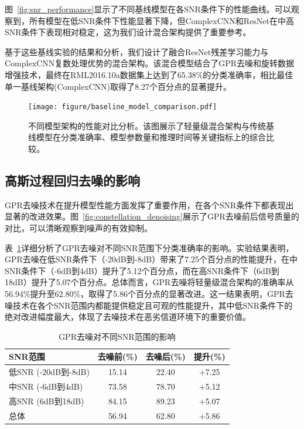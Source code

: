 \documentclass[conference]{IEEEtran}
\begin{document}
图~\ref{fig:snr_performance}显示了不同基线模型在各SNR条件下的性能曲线。可以观察到，所有模型在低SNR条件下性能显著下降，但ComplexCNN和ResNet在中高SNR条件下表现相对稳定，这为我们设计混合架构提供了重要参考。

基于这些基线实验的结果和分析，我们设计了融合ResNet残差学习能力与ComplexCNN复数处理优势的混合架构。该混合模型结合了GPR去噪和旋转数据增强技术，最终在RML2016.10a数据集上达到了65.38\%的分类准确率，相比最佳单一基线架构(ComplexCNN)取得了8.27个百分点的显著提升。

\begin{figure}[htbp]
\centering
\texttt{[image: figure/baseline\_model\_comparison.pdf]}
\caption{不同模型架构的性能对比分析。该图展示了轻量级混合架构与传统基线模型在分类准确率、模型参数量和推理时间等关键指标上的综合比较。}
\label{fig:model_comparison}
\end{figure}

\subsection{高斯过程回归去噪的影响}
GPR去噪技术在提升模型性能方面发挥了重要作用，在各个SNR条件下都表现出显著的改进效果。图~\ref{fig:constellation_denoising}展示了GPR去噪前后信号质量的对比，可以清晰观察到噪声的有效抑制。

表~\ref{tab:gpr_impact}详细分析了GPR去噪对不同SNR范围下分类准确率的影响。实验结果表明，GPR去噪在低SNR条件下（-20dB到-8dB）带来了7.25个百分点的性能提升，在中SNR条件下（-6dB到4dB）提升了5.12个百分点，而在高SNR条件下（6dB到18dB）提升了5.07个百分点。总体而言，GPR去噪将轻量级混合架构的准确率从56.94\%提升至62.80\%，取得了5.86个百分点的显著改进。这一结果表明，GPR去噪技术在各个SNR范围内都能提供稳定且可观的性能提升，其中低SNR条件下的绝对改进幅度最大，体现了去噪技术在恶劣信道环境下的重要价值。

\begin{table}[h]
\centering
\caption{GPR去噪对不同SNR范围的影响}
\label{tab:gpr_impact}
\begin{tabular}{@{}lccc@{}}
\toprule
SNR范围 & 去噪前(\%) & 去噪后(\%) & 提升(\%) \\
\midrule
低SNR (-20dB到-8dB) & 15.14 & 22.40 & +7.25 \\
中SNR (-6dB到4dB) & 73.58 & 78.70 & +5.12 \\
高SNR (6dB到18dB) & 84.15 & 89.23 & +5.07 \\
总体 & 56.94 & 62.80 & +5.86 \\
\bottomrule
\end{tabular}
\end{table}
\end{document}
